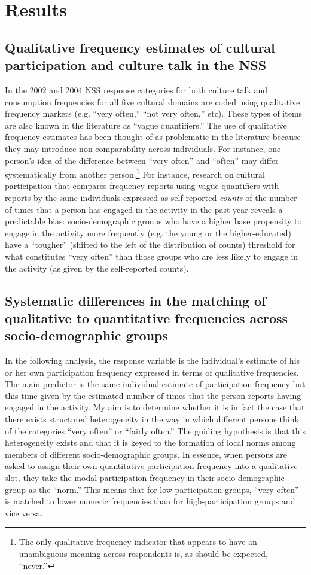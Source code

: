 \documentclass[11pt]{article}
\begin{document}
\section{Results}
\subsection{Qualitative frequency estimates of cultural participation and culture talk in the NSS}
In the 2002 and 2004 NSS response categories for both culture talk and consumption frequencies for all five cultural domains are coded using qualitative frequency markers (e.g. ``very often,'' ``not very often,'' etc).  These types of items are also known in the literature as ``vague quantifiers.'' The use of qualitative frequency estimates has been thought of as problematic in the literature because they may introduce non-comparability across individuals.  For instance, one person's idea of the difference between ``very often'' and ``often'' may differ systematically from another person.\footnote{The only qualitative frequency indicator that appears to have an unambiguous meaning across respondents is, as should be expected, ``never.''}  For instance, research on cultural participation that compares frequency reports using vague quantifiers with reports by the same individuals expressed as self-reported \textit{counts} of the number of times that a person has engaged in the activity in the past year reveals a predictable bias:  socio-demographic groups who have a higher base propensity to engage in the activity more frequently (e.g. the young or the higher-educated) have a ``tougher'' (shifted to the left of the distribution of counts) threshold for what constitutes ``very often'' than those groups who are less likely to engage in the activity (as given by the self-reported counts).  

\subsection{Systematic differences in the matching of qualitative to quantitative frequencies across socio-demographic groups}
In the following analysis, the response variable is the individual's estimate of his or her own participation frequency expressed in terms of qualitative frequencies.  The main predictor is the same individual estimate of participation frequency but this time given by the estimated number of times that the person reports having engaged in the activity. My aim is to determine whether it is in fact the case that there exists structured heterogeneity in the way in which different persons think of the categories ``very often'' or ``fairly often.''  The guiding hypothesis is that this heterogeneity exists and that it is keyed to the formation of local norms among members of different socio-demographic groups.  In essence, when persons are asked to assign their own quantitative participation frequency into a qualitative slot, they take the modal participation frequency in their socio-demographic group as the ``norm.''  This means that for low participation groups, ``very often'' is matched to lower numeric frequencies than for high-participation groups and vice versa.
\end{document}
